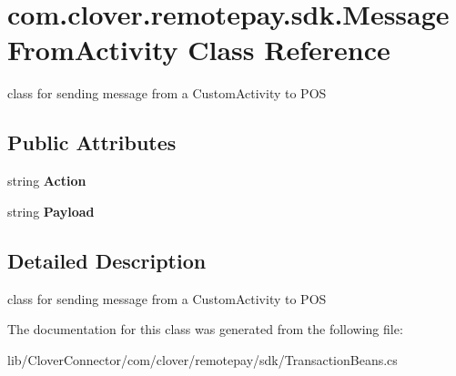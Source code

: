 \hypertarget{classcom_1_1clover_1_1remotepay_1_1sdk_1_1_message_from_activity}{}\section{com.\+clover.\+remotepay.\+sdk.\+Message\+From\+Activity Class Reference}
\label{classcom_1_1clover_1_1remotepay_1_1sdk_1_1_message_from_activity}


class for sending message from a Custom\+Activity to P\+OS  


\subsection*{Public Attributes}
\begin{DoxyCompactItemize}
\item 
\mbox{\label{classcom_1_1clover_1_1remotepay_1_1sdk_1_1_message_from_activity_a77087b4d5c8e7761191610399c98355b}} 
string {\bfseries Action}
\item 
\mbox{\label{classcom_1_1clover_1_1remotepay_1_1sdk_1_1_message_from_activity_afda5117692366e455d859d165f798243}} 
string {\bfseries Payload}
\end{DoxyCompactItemize}


\subsection{Detailed Description}
class for sending message from a Custom\+Activity to P\+OS 



The documentation for this class was generated from the following file\+:\begin{DoxyCompactItemize}
\item 
lib/\+Clover\+Connector/com/clover/remotepay/sdk/Transaction\+Beans.\+cs\end{DoxyCompactItemize}
